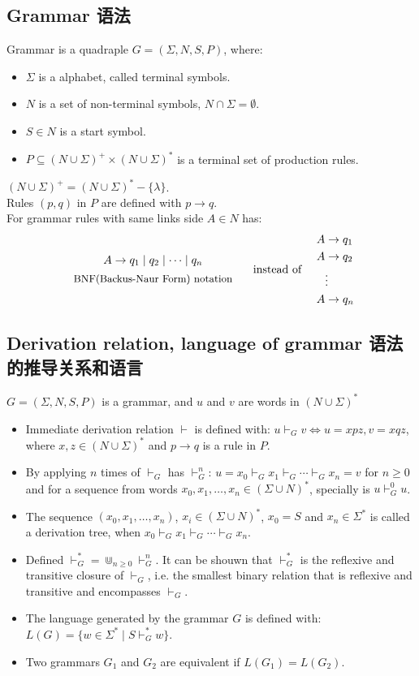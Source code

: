 \documentclass[a4paper,11pt,utf8]{article}
\newcommand{\newindent}{\\ \hspace*{\parindent}}
\newcommand{\lineindent}{\hspace*{\parindent}}
\begin{document}
\subsection{Grammar 语法}
Grammar is a quadraple $G = (\Sigma, N, S, P)$, where: 
\begin{itemize}
    \item $\Sigma$ is a alphabet, called terminal symbols.
    \item $N$ is a set of non-terminal symbols, $N \cap \Sigma = \emptyset$.
    \item $S \in N$ is a start symbol.
    \item $P \subseteq (N \cup \Sigma)^+ \times (N \cup \Sigma)^*$ is a terminal set of production rules.
\end{itemize}
\lineindent $(N \cup \Sigma)^+ = (N \cup \Sigma)^* - \{\lambda\}$.  \newindent
Rules $(p,q)$ in $P$ are defined with $p \to q$. \newindent
For grammar rules with same links side $A \in N$ has:
\[
\begin{array}{c}
A \to q_1 \mid q_2 \mid \cdots \mid q_n \\[1ex]
\text{\small BNF(Backus-Naur Form) notation}
\end{array}
\quad \text{ instead of } \quad
\begin{aligned}
A &\to q_1 \\
A &\to q_2 \\
& \vdots \\
A &\to q_n
\end{aligned}
\]
\subsection{Derivation relation, language of grammar 语法的推导关系和语言}
$G = (\Sigma, N, S, P)$ is a grammar, and $u$ and $v$ are words in $(N \cup \Sigma)^*$
\begin{itemize}
    \item Immediate derivation relation $\vdash$ is defined with: $u \vdash_G v \Longleftrightarrow u=xpz, v=xqz$, where $x,z \in (N \cup \Sigma)^*$ and $p \to q$ is a rule in $P$.
    \item By applying $n$ times of $\vdash_G$ has $\vdash_G^n$: $u = x_0 \vdash_G x_1 \vdash_G \cdots \vdash_G x_n = v$ for $n \geq 0$ and for a sequence from words $x_0, x_1, \dots, x_n \in (\Sigma \cup N)^*$, specially is $u \vdash_G^0 u$.
    \item The sequence $(x_0, x_1, \dots, x_n)$, $x_i \in (\Sigma \cup N)^*$, $x_0 = S$ and $x_n \in \Sigma^*$ is called a derivation tree, when $x_0 \vdash_G x_1 \vdash_G \cdots \vdash_G x_n$.
    \item Defined $\vdash_G^* = \Cup_{n \geq 0} \vdash_G^n$. It can be shouwn that $\vdash_G^*$ is the reflexive and transitive closure of $\vdash_G$, i.e. the smallest binary relation that is reflexive and transitive and encompasses $\vdash_G$.
    \item The language generated by the grammar $G$ is defined with: $L(G) = \{w \in \Sigma^* \mid S \vdash_G^* w\}$.
    \item Two grammars $G_1$ and $G_2$ are equivalent if $L(G_1) = L(G_2)$.
\end{itemize}
\end{document}
